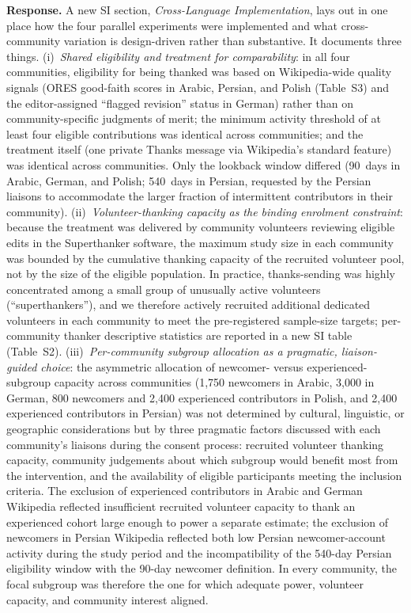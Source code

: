 \documentclass[12pt]{article}
\begin{document}
\textbf{Response.} A new SI section, \textit{Cross-Language Implementation}, lays out in one place how the four parallel experiments were implemented and what cross-community variation is design-driven rather than substantive. It documents three things. (i)~\emph{Shared eligibility and treatment for comparability}: in all four communities, eligibility for being thanked was based on Wikipedia-wide quality signals (ORES good-faith scores in Arabic, Persian, and Polish (Table~S3) and the editor-assigned ``flagged revision'' status in German) rather than on community-specific judgments of merit; the minimum activity threshold of at least four eligible contributions was identical across communities; and the treatment itself (one private Thanks message via Wikipedia's standard feature) was identical across communities. Only the lookback window differed (90~days in Arabic, German, and Polish; 540~days in Persian, requested by the Persian liaisons to accommodate the larger fraction of intermittent contributors in their community). (ii)~\emph{Volunteer-thanking capacity as the binding enrolment constraint}: because the treatment was delivered by community volunteers reviewing eligible edits in the Superthanker software, the maximum study size in each community was bounded by the cumulative thanking capacity of the recruited volunteer pool, not by the size of the eligible population. In practice, thanks-sending was highly concentrated among a small group of unusually active volunteers (``superthankers''), and we therefore actively recruited additional dedicated volunteers in each community to meet the pre-registered sample-size targets; per-community thanker descriptive statistics are reported in a new SI table (Table~S2). (iii)~\emph{Per-community subgroup allocation as a pragmatic, liaison-guided choice}: the asymmetric allocation of newcomer- versus experienced-subgroup capacity across communities (1{,}750 newcomers in Arabic, 3{,}000 in German, 800 newcomers and 2{,}400 experienced contributors in Polish, and 2{,}400 experienced contributors in Persian) was not determined by cultural, linguistic, or geographic considerations but by three pragmatic factors discussed with each community's liaisons during the consent process: recruited volunteer thanking capacity, community judgements about which subgroup would benefit most from the intervention, and the availability of eligible participants meeting the inclusion criteria. The exclusion of experienced contributors in Arabic and German Wikipedia reflected insufficient recruited volunteer capacity to thank an experienced cohort large enough to power a separate estimate; the exclusion of newcomers in Persian Wikipedia reflected both low Persian newcomer-account activity during the study period and the incompatibility of the 540-day Persian eligibility window with the 90-day newcomer definition. In every community, the focal subgroup was therefore the one for which adequate power, volunteer capacity, and community interest aligned.
\end{document}
